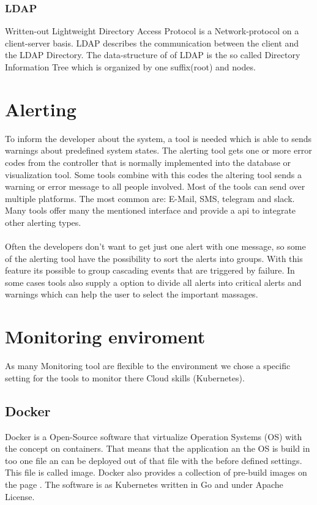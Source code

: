 \subsubsection{LDAP}
Written-out Lightweight Directory Access Protocol is a Network-protocol on a client-server basis. LDAP describes the communication between the client and the LDAP Directory. The data-structure of of LDAP is the so called Directory Information Tree which is organized by one suffix(root) and nodes.  

\section{Alerting}
To inform the developer about the system, a tool is needed which is able to sends warnings about predefined system states.
The alerting tool gets one or more error codes from the controller that is normally implemented into the database or visualization tool. Some tools combine with this codes the altering tool sends a warning or error message to all people involved. Most of the tools can send over multiple platforms. The most common are: E-Mail, SMS, telegram and slack. Many tools offer many the mentioned interface and provide a api to integrate other alerting types.\\
\\
Often the developers don’t want to get just one alert with one message, so some of the alerting tool have the possibility to sort the alerts into groups. With this feature its possible to group cascading events that are triggered by failure. In some cases tools also supply a option to divide all alerts into critical alerts and warnings which can help the user to select the important massages.  

\section{Monitoring enviroment}
As many Monitoring tool are flexible to the environment we chose a specific setting for the tools to monitor there Cloud skills (Kubernetes). \cite{Vohra2016} 
\subsection{Docker}
Docker is a Open-Source software that virtualize Operation Systems (OS) with the concept on containers. That means that the application an the OS is build in too one file an can be deployed out of that file with the before defined settings. This file is called image. Docker also provides a collection of pre-build images on the page  \cite{Docker}. The software is as Kubernetes written in Go and under Apache License.

